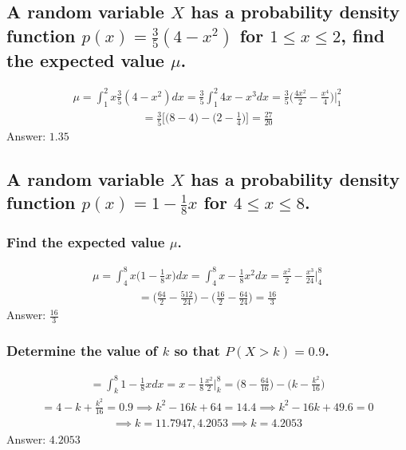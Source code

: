\documentclass{article}
\begin{document}
\subsection{A random variable $X$ has a probability density function $p(x) = \frac{3}{5}(4 - x^2)$ for $1 \leq x \leq 2$, find the expected value $\mu$.}
\begin{align*}
	\mu = \int_1^2 {x \frac{3}{5}(4 - x^2) dx} = \frac{3}{5} \int_1^2 {4x - x^3 dx} = \frac{3}{5} \bigg( \frac{4x^2}{2} - \frac{x^4}{4} \bigg) \bigg|_1^2
\end{align*}
\begin{align*}
	= \frac{3}{5} \bigg[ \bigg( 8 - 4 \bigg) - \bigg( 2 - \frac{1}{4} \bigg) \bigg] = \frac{27}{20}
\end{align*}
Answer: $1.35$

\subsection{A random variable $X$ has a probability density function $p(x) = 1 - \frac{1}{8}x$ for $4 \leq x \leq 8$.}
\subsubsection{Find the expected value $\mu$.}
\begin{align*}
	\mu = \int_4^8{x\bigg( 1 - \frac{1}{8}x \bigg)dx} = \int_4^8{x - \frac{1}{8}x^2 dx} = \frac{x^2}{2} - \frac{x^3}{24} \bigg|_4^8
\end{align*}
\begin{align*}
	= \bigg( \frac{64}{2} - \frac{512}{24} \bigg) - \bigg( \frac{16}{2} - \frac{64}{24} \bigg) = \frac{16}{3}
\end{align*}
Answer: $\frac{16}{3}$

\subsubsection{Determine the value of $k$ so that $P(X > k) = 0.9$.}
\begin{align*}
	= \int_k^8 {1 - \frac{1}{8}x dx} = x - \frac{1}{8} \frac{x^2}{2} \bigg|_k^8 = \bigg( 8 - \frac{64}{16} \bigg) - \bigg( k - \frac{k^2}{16} \bigg)
\end{align*}
\begin{align*}
	= 4 - k + \frac{k^2}{16} = 0.9 \implies k^2 - 16k + 64 = 14.4 \implies k^2 - 16k + 49.6 = 0 
\end{align*}
\begin{align*}
	\implies k = 11.7947, 4.2053 \implies k = 4.2053
\end{align*}
Answer: $4.2053$
\end{document}
